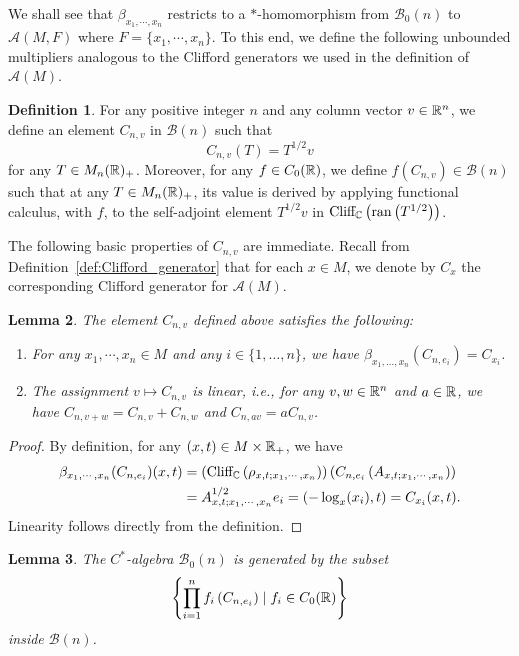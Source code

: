 \documentclass[11pt]{article}
\theoremstyle{definition}
\newtheorem{Def}{Definition}[section]
\theoremstyle{plain}
\newtheorem{Lem}[Def]{Lemma}
\def\A{\mathcal A}\def\C{\mathcal C}\def\B{\mathcal B}\def\E{\mathcal E}\def\O{\mathcal O}\def\h{\mathfrak h}\def\K{\mathcal K}\def\F{\mathcal F}\def\P{\mathcal P}\def\L{\mathcal L}\def\R{\mathcal R}\def\Q{\mathcal Q}\def\H{\mathcal H}\def\S{\mathcal S}\def\N{\mathcal N}\def\U{\mathcal U}\def\V{\mathcal V}
\def\Cl{\textup{Cliff}_{\IC}}
\begin{document}
We shall see that $\beta_{x_1, \cdots, x_n}$ restricts to a $*$-homomorphism from $\B_0(n)$ to $\A(M,F)$ where $F=\{x_1, \cdots, x_n\}$. To this end, we define the following unbounded multipliers analogous to the Clifford generators we used in the definition of $\A(M)$. 

\begin{Def}
For any positive integer $n$ and any column vector $v \in \mathbb R^n$, we define an element $C_{n,v}$ in $\B(n)$ such that 
\[C_{n,v}(T) = T^{1/2} v\]
for any $T \in M_n(\mathbb R)_{+}$. Moreover, for any $f \in C_0(\mathbb R)$, we define $f \left(C_{n,v}\right) \in \B(n)$ such that at any  $T \in M_n(\mathbb R)_{+}$, its value is derived by applying functional calculus, with $f$, to the self-adjoint element $T^{1/2} v$ in $\Cl\left(\operatorname{ran}\left({T}^{1/2}\right)\right)$.
\end{Def}

The following basic properties of $C_{n,v}$ are immediate. Recall from Definition~\ref{def:Clifford_generator} that for each $x\in M$, we denote by $C_{x}$ the corresponding Clifford generator for $\A(M)$. 

\begin{Lem}\label{connection AM and Bn}
The element $C_{n,v}$ defined above satisfies the following:
\begin{enumerate}[(1)]
\item For any $x_1, \cdots, x_n \in M$ and any $i \in \{1, \ldots, n\}$, we have $\beta_{x_1, \ldots, x_n} (C_{n, e_i}) = C_{x_i}$. 
\item The assignment $v \mapsto C_{n,v}$ is linear, i.e., for any $v,w \in \mathbb R^n$ and $a \in \mathbb R$, we have $C_{n, v+w} = C_{n, v} + C_{n, w}$ and $C_{n, av} = aC_{n,v}$. 
\end{enumerate}
\end{Lem}

\begin{proof}
By definition, for any $(x,t) \in M \times \mathbb R_+$, we have 
\[\begin{split}\beta_{x_1, \cdots, x_n} (C_{n,e_i}) (x,t)&= \left(\Cl\left(\rho_{x,t; x_1, \cdots, x_n}\right) \right) \left(C_{n,e_i}\left(A_{x,t; x_1, \cdots, x_n}\right)\right)\\
&=A^{1/2}_{x,t; x_1, \cdots, x_n}e_i=(-\log_x(x_i),t)=C_{x_i}(x,t).\end{split}\]
Linearity follows directly from the definition.
\end{proof}

\begin{Lem}\label{generators Bn}
The $C^*$-algebra $\B_0(n)$ is generated by the subset
\[\left\{ \prod_{i=1}^{n} f_i\left(C_{n, e_i}\right) \mid f_i \in C_0(\mathbb R) \right\} \]
inside $\B(n)$. 
\end{Lem}
\end{document}
